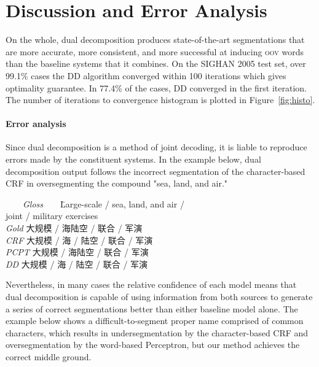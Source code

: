 \section{Discussion and Error Analysis}

On the whole, dual decomposition produces state-of-the-art segmentations that are more accurate, more consistent, and more successful at inducing \textsc{oov} words than the baseline systems that it combines.
On the SIGHAN 2005 test set, over 99.1\% cases the DD algorithm converged within 100 iterations which gives optimality guarantee. 
In 77.4\% of the cases, DD converged in the first iteration. The number of iterations to convergence histogram is plotted in Figure~\ref{fig:histo}.

\paragraph{Error analysis}

Since dual decomposition is a method of joint decoding, it is liable to reproduce errors made by the constituent systems. In the example below, dual decomposition output follows the incorrect segmentation of the character-based CRF in oversegmenting the compound "sea, land, and air." 

\begin{small}
\begin{tabbing}
\ \ \ \ \= \emph{Gloss}\ \ \ \ \= Large-scale / sea, land, and air / \\ 
\> \> joint / military exercises\\
\> \emph{Gold}\> 大规模 / 海陆空 / 联合 / 军演\\

\> \emph{CRF}\> 大规模 / 海 / 陆空 / 联合 / 军演\\

\> \emph{PCPT}\> 大规模 / 海陆空 / 联合 / 军演\\

\> \emph{DD}\> 大规模 / 海 / 陆空 / 联合 / 军演\\
\end{tabbing}
\end{small}
Nevertheless, in many cases the relative confidence of each model means that dual decomposition is capable of using information from both sources to generate a series of correct segmentations better than either baseline model alone. The example below shows a difficult-to-segment proper name comprised of common characters, which results in undersegmentation by the character-based CRF and oversegmentation by the word-based Perceptron, but our method achieves the correct middle ground.

